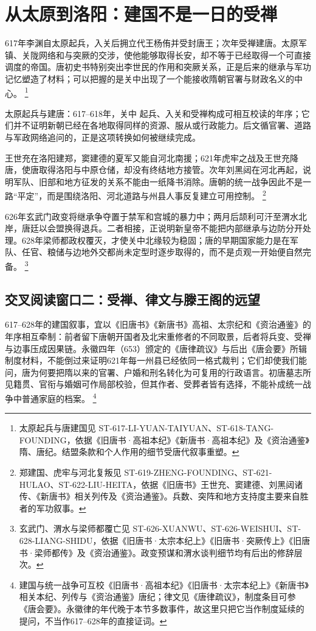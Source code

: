 \section{从太原到洛阳：建国不是一日的受禅}
\label{sec:early-tang-foundation}

617年李渊自太原起兵，入关后拥立代王杨侑并受封唐王；次年受禅建唐。太原军镇、关陇网络和与突厥的交涉，使他能够取得长安，却不等于已经取得一个可直接调度的帝国。唐初史书特别突出李世民的作用和突厥关系，正是后来的继承与军功记忆塑造了材料；可以把握的是关中出现了一个能接收隋朝官署与财政名义的中心。%
\footnote{太原起兵与唐建国见 ST-617-LI-YUAN-TAIYUAN、ST-618-TANG-FOUNDING，依据《旧唐书·高祖本纪》《新唐书·高祖本纪》及《资治通鉴》隋、唐纪。结盟条款和个人作用的细节受唐代叙事重塑。}

\begin{event}{太原起兵与建唐：617--618年，关中}
起兵、入关和受禅构成可相互校读的年序；它们并不证明新朝已经在各地取得同样的资源、服从或行政能力。后文循官署、道路与军政网络追问的，正是这项转换如何被继续完成。
\end{event}

王世充在洛阳建郑，窦建德的夏军又能自河北南援；621年虎牢之战及王世充降唐，使唐取得洛阳与中原仓储，却没有终结地方接管。次年刘黑闼在河北再起，说明军队、旧部和地方征发的关系不能由一纸降书消除。唐朝的统一战争因此不是一路“平定”，而是围绕洛阳、河北道路与州县人事反复建立可用控制。%
\footnote{郑建国、虎牢与河北复叛见 ST-619-ZHENG-FOUNDING、ST-621-HULAO、ST-622-LIU-HEITA，依据《旧唐书》王世充、窦建德、刘黑闼诸传、《新唐书》相关列传及《资治通鉴》。兵数、突阵和地方支持度主要来自胜者的军功叙事。}

626年玄武门政变将继承争夺置于禁军和宫城的暴力中；两月后颉利可汗至渭水北岸，唐廷以会盟换得退兵。二者相接，正说明新皇帝不能把内部继承与边防分开处理。628年梁师都政权覆灭，才使关中北缘较为稳固；唐的早期国家能力是在军队、任官、粮储与边地外交都尚未定型时逐步取得的，而不是贞观一开始便自然完备。%
\footnote{玄武门、渭水与梁师都覆亡见 ST-626-XUANWU、ST-626-WEISHUI、ST-628-LIANG-SHIDU，依据《旧唐书·太宗本纪上》《旧唐书·突厥传上》《旧唐书·梁师都传》及《资治通鉴》。政变预谋和渭水谈判细节均有后出的修辞层次。}

\subsection{交叉阅读窗口二：受禅、律文与滕王阁的远望}

617--628年的建国叙事，宜以《旧唐书》《新唐书》高祖、太宗纪和《资治通鉴》的年序相互牵制：前者留下唐朝开国者及北宋重修者的不同取景，后者将兵变、受禅与边事压成因果链。永徽四年（653）颁定的《唐律疏议》与后出《唐会要》所辑制度材料，不能倒过来证明621年每一州县已经依同一格式裁判；它们却使我们能问，唐为何要把隋以来的官署、户婚和刑名转化为可复用的行政语言。初唐墓志所见籍贯、官衔与婚姻可作局部校验，但其作者、受葬者皆有选择，不能补成统一战争中普通家庭的档案。%
\footnote{建国与统一战争可互校《旧唐书·高祖本纪》《旧唐书·太宗本纪上》《新唐书》相关本纪、列传与《资治通鉴》唐纪；律文见《唐律疏议》，制度条目可参《唐会要》。永徽律的年代晚于本节多数事件，故这里只把它当作制度延续的提问，不当作617--628年的直接证词。}

